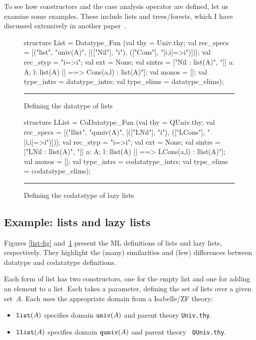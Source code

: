 To see how constructors and the case analysis operator are defined, let us
examine some examples.  These include lists and trees/forests, which I have
discussed extensively in another paper~\cite{paulson-set-II}.

\begin{figure}
\begin{ttbox} 
structure List = Datatype_Fun
 (val thy = Univ.thy;
  val rec_specs = 
      [("list", "univ(A)",
          [(["Nil"],    "i"), 
           (["Cons"],   "[i,i]=>i")])];
  val rec_styp = "i=>i";
  val ext = None;
  val sintrs = 
      ["Nil : list(A)",
       "[| a: A;  l: list(A) |] ==> Cons(a,l) : list(A)"];
  val monos = [];
  val type_intrs = datatype_intrs;
  val type_elims = datatype_elims);
\end{ttbox}
\hrule
\caption{Defining the datatype of lists} \label{list-fig}

\medskip
\begin{ttbox}
structure LList = CoDatatype_Fun
 (val thy = QUniv.thy;
  val rec_specs = 
      [("llist", "quniv(A)",
          [(["LNil"],   "i"), 
           (["LCons"],  "[i,i]=>i")])];
  val rec_styp = "i=>i";
  val ext = None;
  val sintrs = 
      ["LNil : llist(A)",
       "[| a: A;  l: llist(A) |] ==> LCons(a,l) : llist(A)"];
  val monos = [];
  val type_intrs = codatatype_intrs;
  val type_elims = codatatype_elims);
\end{ttbox}
\hrule
\caption{Defining the codatatype of lazy lists} \label{llist-fig}
\end{figure}

\subsection{Example: lists and lazy lists}
Figures \ref{list-fig} and~\ref{llist-fig} present the ML definitions of
lists and lazy lists, respectively.  They highlight the (many) similarities
and (few) differences between datatype and codatatype definitions.

Each form of list has two constructors, one for the empty list and one for
adding an element to a list.  Each takes a parameter, defining the set of
lists over a given set~$A$.  Each uses the appropriate domain from a
Isabelle/ZF theory:
\begin{itemize}
\item ${\tt list}(A)$ specifies domain ${\tt univ}(A)$ and parent theory {\tt Univ.thy}.

\item ${\tt llist}(A)$ specifies domain ${\tt quniv}(A)$ and parent theory {\tt
QUniv.thy}.
\end{itemize}

